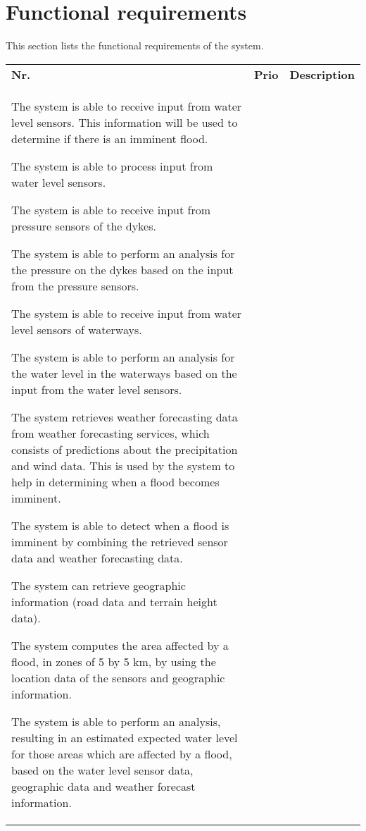 \newpage
\section{Functional requirements}
This section lists the functional requirements of the system.
\begin{longtable}{L{0.1\textwidth} L{0.12\textwidth} L{0.78\textwidth}}

    \textbf{Nr.} & \textbf{Prio}  & \textbf{Description} \\
    
    {The system is able to receive input from water level sensors. This information will be used to determine if there is an imminent flood.}
    
    { The system is able to process input from water level sensors. }
    
	{The system is able to receive input from pressure sensors of the dykes.}
	
	{The system is able to perform an analysis for the pressure on the dykes based on the input from the pressure sensors.}
	
	{The system is able to receive input from water level sensors of waterways.}
	
	{The system is able to perform an analysis for the water level in the waterways based on the input from the water level sensors.}

    {The system retrieves weather forecasting data from weather forecasting services, which consists of predictions about the precipitation and wind data. This is used by the system to help in determining when a flood becomes imminent.}
     
    { The system is able to detect when a flood is imminent by combining the retrieved sensor data and weather forecasting data. }
    
    { The system can retrieve geographic information (road data and terrain height data).}
        
    { The system computes the area affected by a flood, in zones of 5 by 5 km, by using the location data of the sensors and geographic information. }
    
    { The system is able to perform an analysis, resulting in an estimated expected water level for those areas which are affected by a flood, based on the water level sensor data, geographic data and weather forecast information. }
    

\end{longtable}
